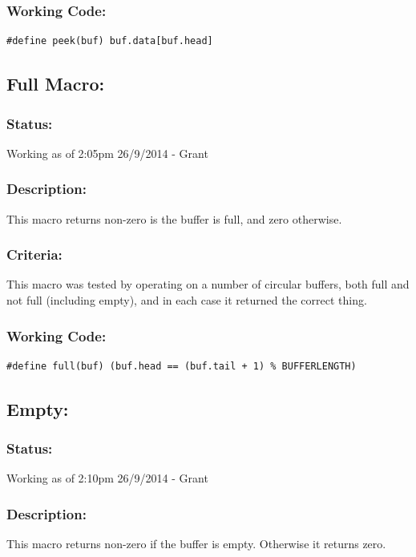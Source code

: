 \documentclass[]{report}
\begin{document}
\subsubsection{Working Code:}
\begin{lstlisting}
#define peek(buf) buf.data[buf.head]
\end{lstlisting}

\subsection{Full Macro:}
\subsubsection{Status:}
Working as of 2:05pm 26/9/2014 - Grant

\subsubsection{Description:}
This macro returns non-zero is the buffer is full, and zero otherwise. 

\subsubsection{Criteria:}
This macro was tested by operating on a number of circular buffers, both full and not full (including empty), and in each case it returned the correct thing.

\subsubsection{Working Code:}
\begin{lstlisting}
#define full(buf) (buf.head == (buf.tail + 1) % BUFFERLENGTH)
\end{lstlisting}

\subsection{Empty:}
\subsubsection{Status:}
Working as of 2:10pm 26/9/2014 - Grant

\subsubsection{Description:}
This macro returns non-zero if the buffer is empty. Otherwise it returns zero.
\end{document}

